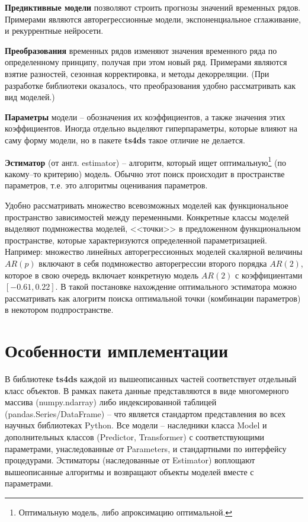 \documentclass[a4paper,14pt]{extreport}
\begin{document}
	\textbf{Предиктивные модели} позволяют строить прогнозы значений временных рядов. Примерами являются авторегрессионные модели, экспоненциальное сглаживание, и рекуррентные нейросети.
	
	\textbf{Преобразования} временных рядов изменяют значения временного ряда по определенному принципу, получая при этом новый ряд. Примерами являются взятие разностей, сезонная корректировка, и методы декорреляции. (При разработке библиотеки оказалось, что преобразования удобно рассматривать как вид моделей.)
	
	\textbf{Параметры} модели -- обозначения их коэффициентов, а также значения этих коэффициентов. Иногда отдельно выделяют гиперпараметры, которые влияют на саму форму модели, но в пакете \textbf{ts4ds} такое отличие не делается.
	
	\textbf{Эстиматор} (от англ. estimator) -- алгоритм, который ищет оптимальную\footnote{Оптимальную модель, либо апроксимацию оптимальной.} (по какому--то критерию) модель. Обычно этот поиск происходит в пространстве параметров, т.е. это алгоритмы оценивания параметров.
	
	Удобно рассматривать множество всевозможных моделей как функциональное пространство зависимостей между переменными. Конкретные классы моделей выделяют подмножества моделей, <<точки>> в предложенном функциональном пространстве, которые характеризуются определенной параметризацией. Например: множество линейных авторегрессионных моделей скалярной величины $AR(p)$ включают в себя подмножество авторегрессии второго порядка $AR(2)$, которое в свою очередь включает конкретную модель $AR(2)$ с коэффициентами $[-0.61, 0.22]$. В такой постановке нахождение оптимального эстиматора можно рассматривать как алогритм поиска оптимальной точки (комбинации параметров) в некотором подпространстве.
	
	\section{Особенности имплементации}
	
	В библиотеке \textbf{ts4ds} каждой из вышеописанных частей соответствует отдельный класс объектов. В рамках пакета данные представляются в виде многомерного массива (numpy.ndarray) либо индексированной таблицей (pandas.Series/DataFrame) -- что является стандартом представления во всех научных библиотеках Python. Все модели -- наследники класса Model и дополнительных классов (Predictor, Transformer) с соответствующими параметрами, унаследованные от Parameters, и стандартными по интерфейсу процедурами. Эстиматоры (наследованные от Estimator) воплощают вышеописанные алгоритмы и возвращают объекты моделей вместе с параметрами.
	
\end{document}
